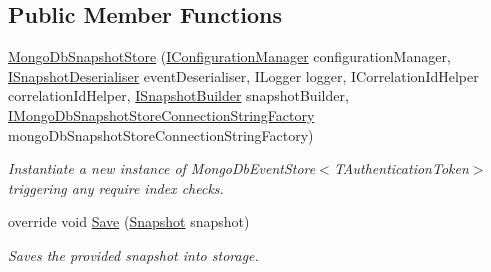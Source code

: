 \subsection*{Public Member Functions}
\begin{DoxyCompactItemize}
\item 
\hyperlink{classCqrs_1_1MongoDB_1_1Events_1_1MongoDbSnapshotStore_a44bcb1f797f9c20ae2214f3488addd27_a44bcb1f797f9c20ae2214f3488addd27}{Mongo\+Db\+Snapshot\+Store} (\hyperlink{interfaceCqrs_1_1Configuration_1_1IConfigurationManager}{I\+Configuration\+Manager} configuration\+Manager, \hyperlink{interfaceCqrs_1_1Events_1_1ISnapshotDeserialiser}{I\+Snapshot\+Deserialiser} event\+Deserialiser, I\+Logger logger, I\+Correlation\+Id\+Helper correlation\+Id\+Helper, \hyperlink{interfaceCqrs_1_1Events_1_1ISnapshotBuilder}{I\+Snapshot\+Builder} snapshot\+Builder, \hyperlink{interfaceCqrs_1_1MongoDB_1_1Events_1_1IMongoDbSnapshotStoreConnectionStringFactory}{I\+Mongo\+Db\+Snapshot\+Store\+Connection\+String\+Factory} mongo\+Db\+Snapshot\+Store\+Connection\+String\+Factory)
\begin{DoxyCompactList}\small\item\em Instantiate a new instance of Mongo\+Db\+Event\+Store$<$\+T\+Authentication\+Token$>$ triggering any require index checks. \end{DoxyCompactList}\item 
override void \hyperlink{classCqrs_1_1MongoDB_1_1Events_1_1MongoDbSnapshotStore_abd129099f8ed40c140ad2b39e730035a_abd129099f8ed40c140ad2b39e730035a}{Save} (\hyperlink{classCqrs_1_1Snapshots_1_1Snapshot}{Snapshot} snapshot)
\begin{DoxyCompactList}\small\item\em Saves the provided {\itshape snapshot}  into storage. \end{DoxyCompactList}\end{DoxyCompactItemize}
